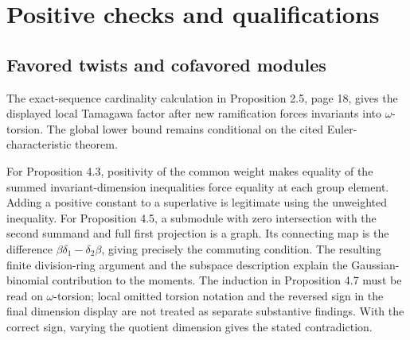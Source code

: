 \documentclass[10pt]{article}
\begin{document}
\section*{Positive checks and qualifications}
\subsection*{Favored twists and cofavored modules}
The exact-sequence cardinality calculation in Proposition 2.5, page 18, gives the displayed local Tamagawa factor after new ramification forces invariants into \(\omega\)-torsion. The global lower bound remains conditional on the cited Euler-characteristic theorem.\par
For Proposition 4.3, positivity of the common weight makes equality of the summed invariant-dimension inequalities force equality at each group element. Adding a positive constant to a superlative is legitimate using the unweighted inequality. For Proposition 4.5, a submodule with zero intersection with the second summand and full first projection is a graph. Its connecting map is the difference \(\beta\delta_1-\delta_2\beta\), giving precisely the commuting condition. The resulting finite division-ring argument and the subspace description explain the Gaussian-binomial contribution to the moments. The induction in Proposition 4.7 must be read on \(\omega\)-torsion; local omitted torsion notation and the reversed sign in the final dimension display are not treated as separate substantive findings. With the correct sign, varying the quotient dimension gives the stated contradiction.\par
\end{document}

